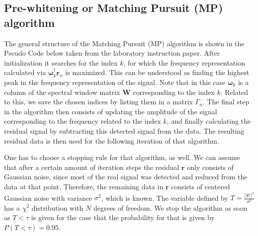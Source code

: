 \subsection{Pre-whitening or Matching Pursuit (MP) algorithm}
The general structure of the  Matching Pursuit (MP) algorithm is shown in the Pseudo Code below taken from the laboratory instruction paper. After initialization it searches for the index $k$, for which the frequency representation calculated via $\boldsymbol{\omega}_{k}^{\dag}\boldsymbol{r}_{n}$ is maximized. This can be understood as finding the highest peak in the frequency representation of the signal. Note that in this case $\boldsymbol{\omega}_{k}$ is a column of the spectral window matrix $\boldsymbol{W}$ corresponding to the index $k$. Related to this, we save the chosen indices by listing them in a matrix $\Gamma_n$. The final step in the algorithm then consists of updating the amplitude of the signal corresponding to the frequency related to the index $k$, and finally calculating the residual signal by subtracting this detected signal from the data. The resulting residual data is then used for the following iteration of that algorithm. 

\begin{center}
\end{center}
One has to choose a stopping rule for that algorithm, as well. We can assume that after a certain amount of iteration steps the residual $\boldsymbol{r}$ only consists of Gaussian noise, since most of the real signal was detected and reduced from the data at that point. Therefore, the remaining data in $\boldsymbol{r}$ consists of centered Gaussian noise with variance $\sigma^{2}$, which is known. The variable defined by $T=\frac{||\boldsymbol{r}||^{2}}{\sigma^{2}}$ has a $\chi^{2}$ distribution with $N$ degrees of freedom. We stop the algorithm as soon as $T<\tau$ is given for the case that the probability for that is given by $P(T < \tau)=0.95$.

